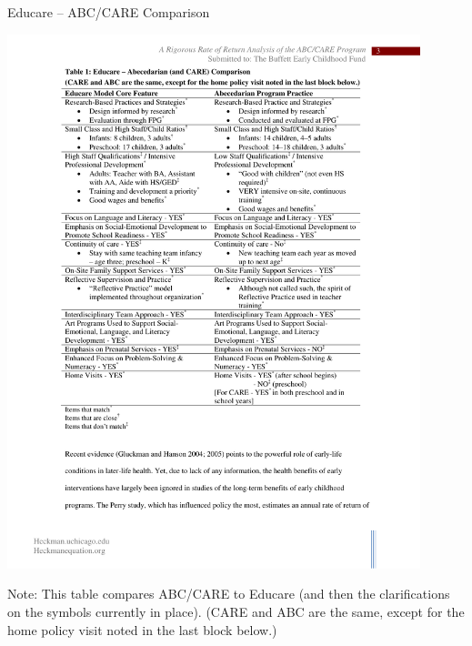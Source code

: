 \begin{table}[H]
\caption{Educare -- ABC/CARE Comparison}
\begin{center}
\includegraphics[width=0.9\textwidth]{output/Educare-Comp-table}
\end{center}
{\flushleft \footnotesize Note: This table compares ABC/CARE to Educare (and then the clarifications on the symbols currently in place). (CARE and ABC are the same, except for the home policy visit noted in the last block below.)\\}
\end{table}


